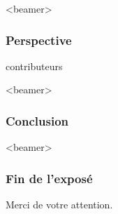 \begin{frame}<beamer>
\frametitle{Perspective}
contributeurs
\end{frame}
\begin{frame}<beamer>
\frametitle{Conclusion}
\end{frame}
\begin{frame}<beamer>\frametitle{Fin de l'exposé}
\begin{center}
Merci de votre attention.
\end{center}
\end{frame}